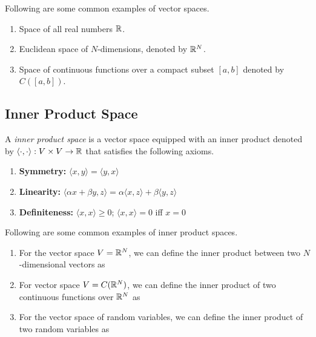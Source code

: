 \documentclass[a4paper,english,12pt]{article}
\begin{document}
\begin{exmp} 
Following are some common examples of vector spaces.  
\begin{enumerate}
\item Space of all real numbers $\mathbb{R}$. 
\item Euclidean space of $N$-dimensions, denoted by $\mathbb{R}^N$.
\item Space of continuous functions over a compact subset $[a,b]$ denoted by $C([a,b])$. 
\end{enumerate}
\end{exmp}

\subsection{Inner Product Space}
A \textit{inner product space} is a vector space equipped with an inner product denoted by $\langle \cdot , \cdot \rangle:V \times V \to \mathbb{R}$ that satisfies the following axioms. 
\begin{enumerate}
\item  \textbf{Symmetry:} $\langle x,y\rangle = \langle y,x\rangle$
\item  \textbf{Linearity:} $\langle\alpha x + \beta y, z\rangle = \alpha\langle x,z\rangle +\beta\langle y,z\rangle$
\item  \textbf{Definiteness:} $\langle x,x\rangle\geq 0$; $\langle x,x \rangle = 0$ iff $x=0$
\end{enumerate}
\begin{exmp} 
Following are some common examples of inner product spaces. 
\begin{enumerate}
\item  For the vector space $V =  \mathbb{R}^N$, 
we can define  the inner product between two $N$-dimensional vectors as 
\item For vector space $V = C(\mathbb{R}^N)$, 
we can define the inner product of two continuous functions over $\mathbb{R}^N$ as 
\item For the vector space of random variables, 
we can define the inner product of two random variables as 
\end{enumerate}
\end{exmp}
\end{document}

